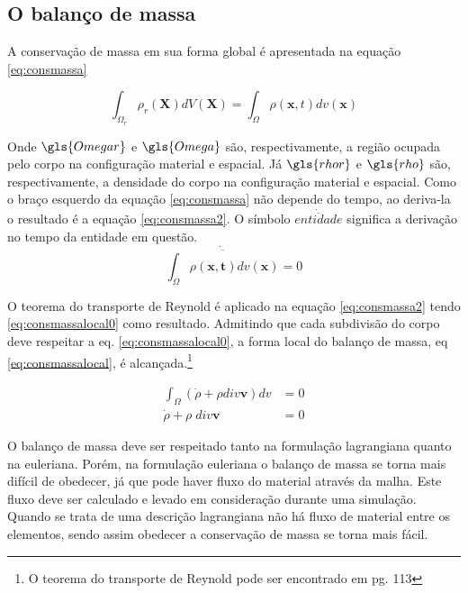 \subsection{O balanço de massa}

A conservação de massa em sua forma global é apresentada na equação \ref{eq:consmassa}

\begin{equation}
    \int_{\Omega_r} \rho_r(\boldsymbol{X}) dV(\boldsymbol{X}) = \int_{\Omega} \rho(\boldsymbol{x},t) dv(\boldsymbol{x}) 
    \label{eq:consmassa}
\end{equation}

Onde $ \gls{Omegar} $ e $ \gls{Omega} $ são, respectivamente, a região ocupada pelo corpo na configuração material e espacial. Já $ \gls{rhor} $ e $ \gls{rho} $ são, respectivamente, a densidade do corpo na configuração material e espacial. Como o braço esquerdo da equação \ref{eq:consmassa} não depende do tempo, ao deriva-la o resultado é a equação \ref{eq:consmassa2}. O símbolo $ \dot{\overline{entidade}} $ significa a derivação no tempo da entidade em questão.
\begin{equation}
    \dot{\overline{\int_{\Omega} \rho(\boldsymbol{x,t}) dv(\boldsymbol{x})}} = 0
    \label{eq:consmassa2}
\end{equation}

O teorema do transporte de Reynold é aplicado na equação \ref{eq:consmassa2} tendo \ref{eq:consmassalocal0} como resultado. Admitindo que cada subdivisão do corpo deve respeitar a eq. \ref{eq:consmassalocal0}, a forma local do balanço de massa, eq \ref{eq:consmassalocal}, é alcançada.\footnote{O teorema do transporte de Reynold pode ser encontrado em \cite{gurtin_fried_anand_2013} pg. 113}

\begin{align}
    \int_{\Omega} (\dot{\rho} + \rho div\boldsymbol{v})  dv &= 0 \label{eq:consmassalocal0} \\
    \dot{\rho} + \rho \; div\boldsymbol{v} &= 0 \label{eq:consmassalocal}
\end{align}

O balanço de massa deve ser respeitado tanto na formulação lagrangiana quanto na euleriana. Porém, na formulação euleriana o balanço de massa se torna mais difícil de obedecer, já que pode haver fluxo do material através da malha. Este fluxo deve ser calculado e levado em consideração durante uma simulação. Quando se trata de uma descrição lagrangiana não há fluxo de material entre os elementos, sendo assim obedecer a conservação de massa se torna mais fácil. 

